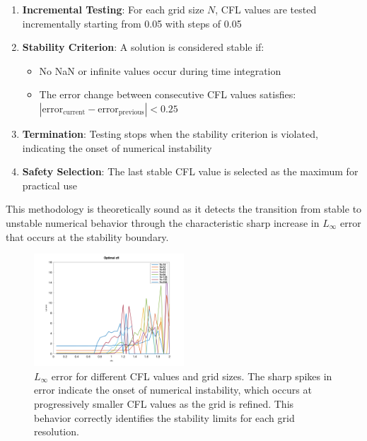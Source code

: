 \begin{enumerate}
	\item \textbf{Incremental Testing}: For each grid size $N$, CFL values are tested incrementally starting from 0.05 with steps of 0.05
	\item \textbf{Stability Criterion}: A solution is considered stable if:
	      \begin{itemize}
		      \item No NaN or infinite values occur during time integration
		      \item The error change between consecutive CFL values satisfies: $|\text{error}_{\text{current}} - \text{error}_{\text{previous}}| < 0.25$
	      \end{itemize}
	\item \textbf{Termination}: Testing stops when the stability criterion is violated, indicating the onset of numerical instability
	\item \textbf{Safety Selection}: The last stable CFL value is selected as the maximum for practical use
\end{enumerate}

This methodology is theoretically sound as it detects the transition from stable to unstable numerical behavior through the characteristic sharp increase in $L_\infty$ error that occurs at the stability boundary.

\begin{figure}[H]
	\begin{center}
		\includegraphics[width=0.5\textwidth]{media/cfl_errors.png}
	\end{center}
	\caption{$L_{\infty}$ error for different CFL values and grid sizes. The sharp spikes in error indicate the onset of numerical instability, which occurs at progressively smaller CFL values as the grid is refined. This behavior correctly identifies the stability limits for each grid resolution.}\label{fig:error_fc}
\end{figure}

